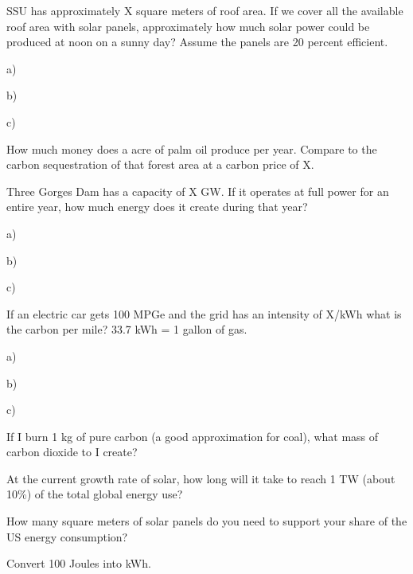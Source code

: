 \documentclass[12pt, oneside]{article}
\begin{document}
SSU has approximately X square meters of roof area.  If we cover all the
available roof area with solar panels, approximately how much solar
power could be produced at noon on a sunny day?  Assume the panels are
20 percent efficient.

a)

b)

c)


\problem{}

How much money does a acre of palm oil produce per year.  Compare to the
carbon sequestration of that forest area at a carbon price of X.



\problem{}
Three Gorges Dam has a capacity of X GW.  If it operates at full power
for an entire year, how much energy does it create during that year?

a)

b)

c)




\problem{}
If an electric car gets 100 MPGe and the grid has an intensity of X/kWh
what is the carbon per mile?  33.7 kWh = 1 gallon of gas.


a)

b)

c)


\problem{}




\problem{}
If I burn 1 kg of pure carbon (a good approximation for coal), what mass
of carbon dioxide to I create?

\problem{}
At the current growth rate of solar, how long will it take to reach 1 TW
(about 10\%) of the total global energy use?


\problem{}
How many square meters of solar panels do you need to support your share
of the US energy consumption?


\problem{}
Convert 100 Joules into kWh.
\end{document}
